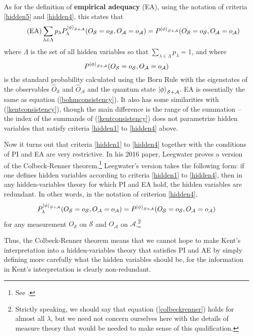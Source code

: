 As for the definition of \textbf{empirical adequacy} (EA), using the notation of criteria \ref{hidden5} and \ref{hidden4}, this states that
\begin{equation}\tag{EA}\label{adeq}
	\sum_{\lambda\in\Lambda}p_\lambda P_\lambda^{\ket{\phi}_{\mathcal{S}+\mathcal{A}}}(O_\mathcal{S}=o_\mathcal{S},O_\mathcal{A}=o_\mathcal{A})=P^{\ket{\phi}_{\mathcal{S}+\mathcal{A}}}(O_\mathcal{S}=o_\mathcal{S},O_\mathcal{A}=o_\mathcal{A})
\end{equation}
where $\Lambda$ is the set of all hidden variables so that $\sum_{\lambda\in\Lambda} p_\lambda = 1$, and where 
$$P^{\ket{\phi}_{\mathcal{S}+\mathcal{A}}}(O_\mathcal{S}=o_\mathcal{S},O_\mathcal{A}=o_\mathcal{A})$$
 is the standard probability calculated using the Born Rule with the eigenstates of the observables $\hat{O}_\mathcal{S}$ and $\hat{O}_\mathcal{A}$ and the quantum state $\ket{\phi}_{\mathcal{S}+\mathcal{A}}$. EA is essentially the same as equation (\ref{bohmconsistency}). It also has some similarities with (\ref{kentconsistency}), though the main difference is the range of the summation -- the index of the summands of (\ref{kentconsistency}) does not parametrize hidden variables that satisfy criteria \ref{hidden1} to \ref{hidden4} above.

Now it turns out that criteria \ref{hidden1} to \ref{hidden4} together with the conditions of PI and EA are very restrictive. In his 2016 paper, Leegwater proves a version of the Colbeck-Renner theorem.\footnote{See \cite{LeegwaterGijs2016Aitf}.} Leegwater's version takes the following form: if one defines hidden variables according to criteria \ref{hidden1} to \ref{hidden4}, then in any hidden-variables theory for which PI and EA hold, the hidden variables are redundant. In other words, in the notation of criterion \ref{hidden4},
\begin{equation}\label{colbeckrenner}
P_\lambda^{\ket{\phi}_{\mathcal{S}+\mathcal{A}}}(O_\mathcal{S}=o_\mathcal{S},O_\mathcal{A}=o_\mathcal{A})=P^{\ket{\phi}_{\mathcal{S}+\mathcal{A}}}(O_\mathcal{S}=o_\mathcal{S},O_\mathcal{A}=o_\mathcal{A})
\end{equation}
for any measurement $O_\mathcal{S}$ on $\mathcal{S}$ and $O_\mathcal{A}$ on $\mathcal{A}$.\footnote{Strictly speaking, we should say that equation (\ref{colbeckrenner}) holds for almost all $\lambda$, but we need not concern ourselves here with the details of measure theory that would be needed to make sense of this qualification.} 

Thus, the Colbeck-Renner theorem means that we cannot hope to make Kent's interpretation into a hidden-variables theory that satisfies PI and AE by simply defining more carefully what the hidden variables should be, for the information in Kent's interpretation is clearly non-redundant.

